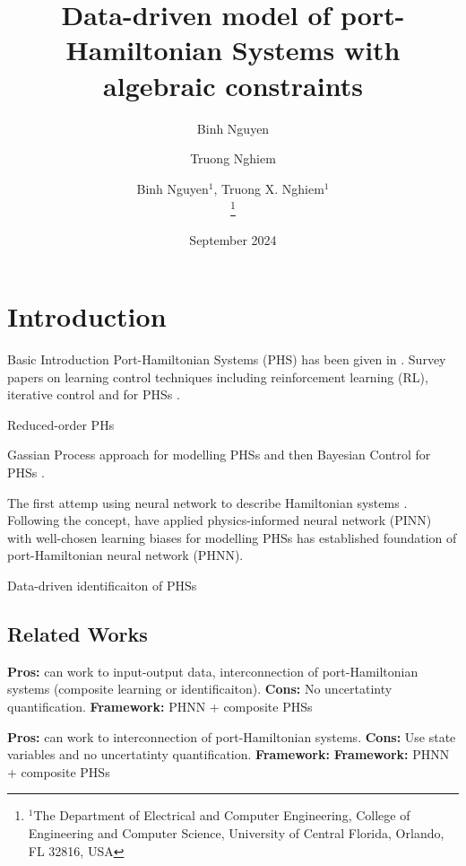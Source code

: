 \documentclass[letterpaper, 10 pt, conference]{ieeeconf}
\title{\LARGE \bf Data-driven model of port-Hamiltonian Systems with algebraic constraints}
\author{Binh Nguyen$^{1}$, Truong X. Nghiem$^{1}$
\author[1]{Binh Nguyen}
\author[2]{Truong Nghiem}
\thanks{$^1$The  Department of Electrical and Computer Engineering, College of Engineering and Computer Science, University of Central Florida, Orlando, FL 32816, USA}
}
\date{September 2024}
\begin{document}
\maketitle


\begin{abstract}
\end{abstract}

\section{Introduction}

Basic Introduction Port-Hamiltonian Systems (PHS) has been given in \cite{schaftPortHamiltonianSystemsTheory2014}. Survey papers on learning control techniques including reinforcement learning (RL), iterative control and for PHSs 
\cite{nageshraoPortHamiltonianSystemsAdaptive2016,rashadTwentyYearsDistributed2020,cherifiOverviewRecentMachine2020}. 

Reduced-order PHs \cite{wuReducedOrderLQG2021,schwerdtnerOptimizationbasedModelOrder2023}


Gassian Process approach for modelling PHSs
\cite{beckersGaussianProcessPortHamiltonian2022,beckersLearningSwitchingPortHamiltonian2023} and then Bayesian Control for PHSs \cite{beckersDataDrivenBayesianControl2023a}.

The first attemp using neural network to describe Hamiltonian systems
\cite{greydanusHamiltonianNeuralNetworks2019a}. 
Following the concept,
\cite{nearyCompositionalLearningDynamical2023,eidnesPseudoHamiltonianNeuralNetworks2023,desaiPortHamiltonianNeuralNetworks2021,duongPortHamiltonianNeuralODE2024} have applied physics-informed neural network (PINN) with well-chosen learning biases for modelling PHSs has established foundation of port-Hamiltonian neural network (PHNN).

Data-driven identificaiton of PHSs 
\cite{rettbergDatadrivenIdentificationLatent2024,otterdijkLearningSubsystemDynamics2024}

\subsection{Related Works}

\noindent\cite{otterdijkLearningSubsystemDynamics2024} {\bf Pros:} can work to input-output data, interconnection of port-Hamiltonian systems (composite learning or identificaiton). {\bf Cons:} No uncertatinty quantification. {\bf Framework:} PHNN + composite PHSs

\noindent\cite{nearyCompositionalLearningDynamical2023} {\bf Pros:} can work to interconnection of port-Hamiltonian systems. {\bf Cons:} Use state variables and no uncertatinty quantification. {\bf Framework:} {\bf Framework:} PHNN + composite PHSs
\end{document}
